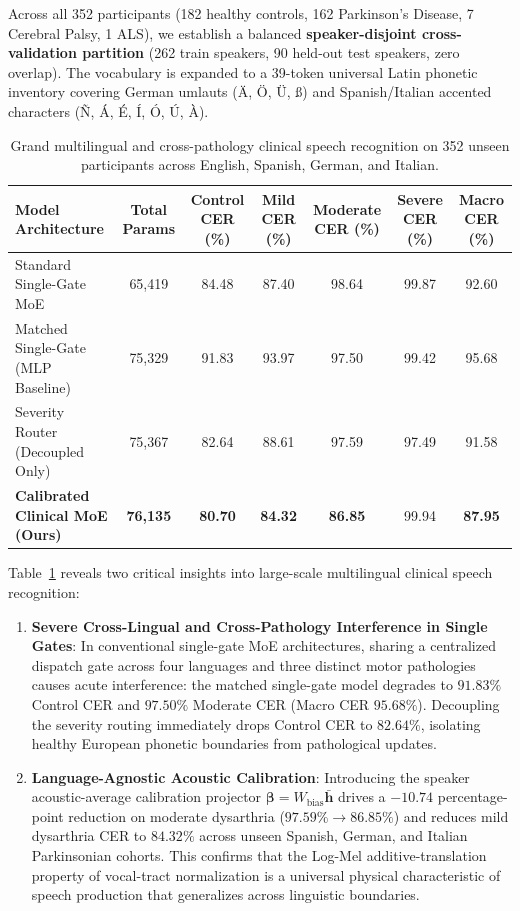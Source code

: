 \documentclass[10pt,twocolumn]{article}
\makeatletter
\newenvironment{adjustbox}[1]{%
  \begin{lrbox}{\@adjbox}%
}{%
  \end{lrbox}%
  \resizebox{\linewidth}{!}{\usebox{\@adjbox}}%
}
\makeatother
\begin{document}
Across all 352 participants (182 healthy controls, 162 Parkinson's Disease, 7 Cerebral Palsy, 1 ALS), we establish a balanced \textbf{speaker-disjoint cross-validation partition} (262 train speakers, 90 held-out test speakers, zero overlap). The vocabulary is expanded to a 39-token universal Latin phonetic inventory covering German umlauts (\"A, \"O, \"U, \ss) and Spanish/Italian accented characters (\~N, \'A, \'E, \'I, \'O, \'U, \`A).

\begin{table}[!t]
\centering
\caption{Grand multilingual and cross-pathology clinical speech recognition on 352 unseen participants across English, Spanish, German, and Italian.}
\label{tab:multilingual_results}
\begin{adjustbox}{width=\textwidth}
\begin{tabular}{lcccccc}
\toprule
\textbf{Model Architecture} & \textbf{Total Params} & \textbf{Control CER (\%)} & \textbf{Mild CER (\%)} & \textbf{Moderate CER (\%)} & \textbf{Severe CER (\%)} & \textbf{Macro CER (\%)} \\
\midrule
Standard Single-Gate MoE & 65,419 & 84.48 & 87.40 & 98.64 & 99.87 & 92.60 \\
Matched Single-Gate (MLP Baseline) & 75,329 & 91.83 & 93.97 & 97.50 & 99.42 & 95.68 \\
Severity Router (Decoupled Only) & 75,367 & 82.64 & 88.61 & 97.59 & 97.49 & 91.58 \\
\textbf{Calibrated Clinical MoE (Ours)} & \textbf{76,135} & \textbf{80.70} & \textbf{84.32} & \textbf{86.85} & 99.94 & \textbf{87.95} \\
\bottomrule
\end{tabular}
\end{adjustbox}
\end{table}

Table~\ref{tab:multilingual_results} reveals two critical insights into large-scale multilingual clinical speech recognition:
\begin{enumerate}
    \item \textbf{Severe Cross-Lingual and Cross-Pathology Interference in Single Gates}: In conventional single-gate MoE architectures, sharing a centralized dispatch gate across four languages and three distinct motor pathologies causes acute interference: the matched single-gate model degrades to $91.83\%$ Control CER and $97.50\%$ Moderate CER (Macro CER $95.68\%$). Decoupling the severity routing immediately drops Control CER to $82.64\%$, isolating healthy European phonetic boundaries from pathological updates.
    \item \textbf{Language-Agnostic Acoustic Calibration}: Introducing the speaker acoustic-average calibration projector $\bm{\beta} = W_{\text{bias}}\bar{\bm{h}}$ drives a $\mathbf{-10.74}$ percentage-point reduction on moderate dysarthria ($97.59\% \to \mathbf{86.85\%}$) and reduces mild dysarthria CER to $\mathbf{84.32\%}$ across unseen Spanish, German, and Italian Parkinsonian cohorts. This confirms that the Log-Mel additive-translation property of vocal-tract normalization is a universal physical characteristic of speech production that generalizes across linguistic boundaries.
\end{enumerate}
\end{document}
